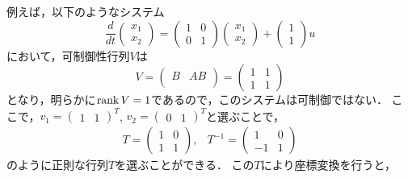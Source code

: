 例えば，以下のようなシステム
\begin{equation}
 \frac{d}{dt}
  \left(
   \begin{array}{c}
    x_1 \\
    x_2
   \end{array}
  \right) = 
  \left(
   \begin{array}{cc}
    1 & 0 \\
    0 & 1
   \end{array}
  \right)
  \left(
   \begin{array}{c}
    x_1 \\
    x_2
   \end{array}
  \right) +
  \left(
   \begin{array}{c}
    1 \\
    1
   \end{array}
  \right) u
\end{equation}
において，可制御性行列$V$は
\begin{equation}
 V = 
  \left(
   \begin{array}{cc}
    B & AB\\
   \end{array}
  \right) =
  \left(
   \begin{array}{cc}
    1 & 1 \\
    1 & 1
   \end{array}
  \right)
\end{equation}
となり，明らかに$\mathop{\rm rank}\nolimits V = 1$であるので，このシステムは可制御ではない．
ここで，$v_1 = (\begin{array}{cc}1 & 1\end{array})^T$, 
$v_2 = (\begin{array}{cc}0 & 1\end{array})^T$と選ぶことで，
\begin{equation}
 \begin{array}{cc}
  T =
   \left(
    \begin{array}{cc}
     1 & 0 \\
     1 & 1
    \end{array}
   \right),
   & 
  T^{-1} =
   \left(
    \begin{array}{cc}
     1 & 0 \\
     -1 & 1
    \end{array}
   \right)
 \end{array}
\end{equation}
のように正則な行列$T$を選ぶことができる．
この$T$により座標変換を行うと，
